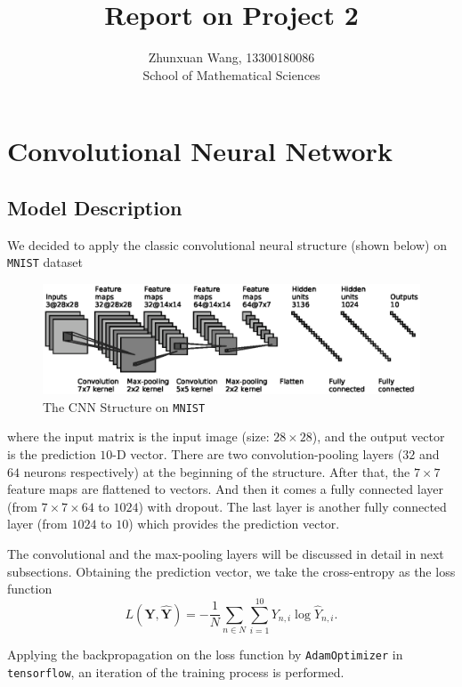 \documentclass[10pt]{article}
\begin{document}
 
 
\title{\textbf{Report on Project 2}}%
\author{Zhunxuan Wang, 13300180086\\ %
School of Mathematical Sciences} %

\maketitle
\section{Convolutional Neural Network}
\subsection{Model Description}
We decided to apply the classic convolutional neural structure \cite{krizhevsky2012imagenet} (shown below) on \texttt{MNIST} dataset
\begin{figure}[H]
\centering
\includegraphics[scale=.9]{convnet.eps}
\caption{The CNN Structure on \texttt{MNIST}}
\label{fig1}
\end{figure}
where the input matrix is the input image (size: $28\times28$), and the output vector is the prediction $10$-D vector. There are two convolution-pooling layers ($32$ and $64$ neurons respectively) at the beginning of the structure. After that, the $7\times7$ feature maps are flattened to vectors. And then it comes a fully connected layer (from $7\times7\times64$ to $1024$) with dropout. The last layer is another fully connected layer (from $1024$ to $10$) which provides the prediction vector.\par
The convolutional and the max-pooling layers will be discussed in detail in next subsections. Obtaining the prediction vector, we take the cross-entropy as the loss function
$$L\left(\mathbf{Y}, \hat{\mathbf{Y}}\right) = -\frac1N\sum\limits_{n \in N}\sum\limits_{i = 1}^{10}Y_{n,i}\log\hat{Y}_{n,i}\text{.}$$\par
Applying the backpropagation \cite{rumelhart1988learning} on the loss function by \texttt{AdamOptimizer} in \texttt{tensorflow}, an iteration of the training process is performed.
\end{document}
